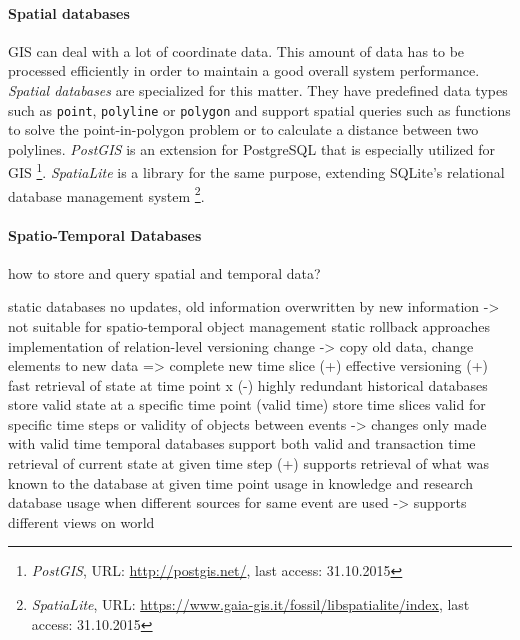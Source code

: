 \paragraph{Spatial databases} %
\label{par:spatial_databases}
GIS can deal with a lot of coordinate data. This amount of data has to be processed efficiently in order to maintain a good overall system performance. \emph{Spatial databases} are specialized for this matter. They have predefined data types such as \texttt{point}, \texttt{polyline} or \texttt{polygon} and support spatial queries such as functions to solve the point-in-polygon problem or to calculate a distance between two polylines. \emph{PostGIS} is an extension for PostgreSQL that is especially utilized for GIS
\footnote{
  \textit{PostGIS},
  URL: \url{http://postgis.net/},
  last access: 31.10.2015
}.
\emph{SpatiaLite} is a library for the same purpose, extending SQLite's relational database management system
\footnote{
  \textit{SpatiaLite},
  URL: \url{https://www.gaia-gis.it/fossil/libspatialite/index},
  last access: 31.10.2015
}.


\paragraph{Spatio-Temporal Databases} %
\label{par:spatio_temporal_databases}

how to store and query spatial and temporal data?

static databases
  no updates, old information overwritten by new information
  -> not suitable for spatio-temporal object management
static rollback approaches
  implementation of relation-level versioning
  change -> copy old data, change elements to new data => complete new time slice
  (+) effective versioning
  (+) fast retrieval of state at time point x
  (-) highly redundant
historical databases
  store valid state at a specific time point (valid time)
  store time slices valid for specific time steps
  or validity of objects between events
  -> changes only made with valid time
temporal databases
  support both valid and transaction time
  retrieval of current state at given time step
  (+) supports retrieval of what was known to the database at given time point
  usage in knowledge and research database
  usage when different sources for same event are used
  -> supports different views on world

